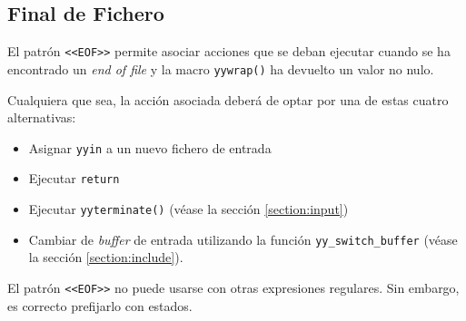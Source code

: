 
\subsection{Final de Fichero}
El patrón \verb|<<EOF>>| permite asociar acciones que se deban 
ejecutar cuando se ha encontrado un \emph{end of file} y la 
macro \verb|yywrap()| ha devuelto un valor no nulo. 

Cualquiera que sea, la acción asociada deberá de optar por una de estas 
cuatro alternativas:
\begin{itemize}
\item
Asignar \verb|yyin| a un nuevo fichero de entrada
\item
Ejecutar \verb|return|
\item
Ejecutar \verb|yyterminate()| (véase  la sección \ref{section:input})
\item
Cambiar de \emph{buffer} de entrada utilizando la función
\verb|yy_switch_buffer| (véase  la sección \ref{section:include}).
\end{itemize}

El patrón \verb|<<EOF>>| no puede usarse con otras expresiones regulares. Sin embargo, es correcto prefijarlo con estados.

